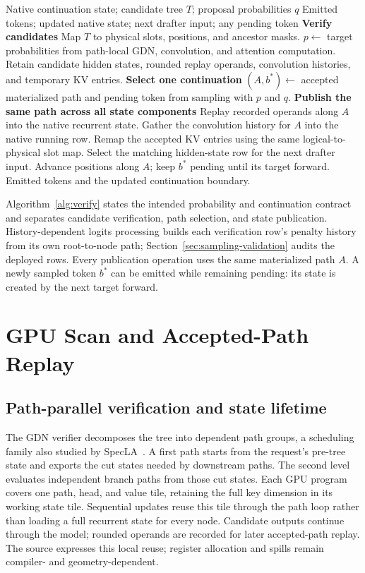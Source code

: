 \documentclass[conference]{IEEEtran}
\begin{document}
\begin{algorithm*}[t]
\caption{Tree verification and native continuation}
\label{alg:verify}
\normalsize\linespread{1.08}\selectfont\raggedright
\begin{algorithmic}[1]
\Require Native continuation state; candidate tree $T$; proposal probabilities $q$
\Ensure Emitted tokens; updated native state; next drafter input; any pending token
\Statex \textbf{Verify candidates}
\State Map $T$ to physical slots, positions, and ancestor masks.
\State $p\gets$ target probabilities from path-local GDN, convolution, and attention computation.
\State Retain candidate hidden states, rounded replay operands, convolution histories, and temporary KV entries.
\Statex \textbf{Select one continuation}
\State $(A,b^*)\gets$ accepted materialized path and pending token from sampling with $p$ and $q$.
\Statex \textbf{Publish the same path across all state components}
  \State Replay recorded operands along $A$ into the native recurrent state.
  \State Gather the convolution history for $A$ into the native running row.
\EndFor
\State Remap the accepted KV entries using the same logical-to-physical slot map.
\State Select the matching hidden-state row for the next drafter input.
\State Advance positions along $A$; keep $b^*$ pending until its target forward.
\State \Return Emitted tokens and the updated continuation boundary.
\end{algorithmic}
\end{algorithm*}

Algorithm~\ref{alg:verify} states the intended probability and continuation contract and separates candidate verification, path selection, and state publication. History-dependent logits processing builds each verification row's penalty history from its own root-to-node path; Section~\ref{sec:sampling-validation} audits the deployed rows. Every publication operation uses the same materialized path $A$. A newly sampled token $b^*$ can be emitted while remaining pending: its state is created by the next target forward.

\section{GPU Scan and Accepted-Path Replay}
\label{sec:kernel}
\subsection{Path-parallel verification and state lifetime}
The GDN verifier decomposes the tree into dependent path groups, a scheduling family also studied by SpecLA~\cite{wang2026specla}. A first path starts from the request's pre-tree state and exports the cut states needed by downstream paths. The second level evaluates independent branch paths from those cut states. Each GPU program covers one path, head, and value tile, retaining the full key dimension in its working state tile. Sequential updates reuse this tile through the path loop rather than loading a full recurrent state for every node. Candidate outputs continue through the model; rounded operands are recorded for later accepted-path replay. The source expresses this local reuse; register allocation and spills remain compiler- and geometry-dependent.
\end{document}

